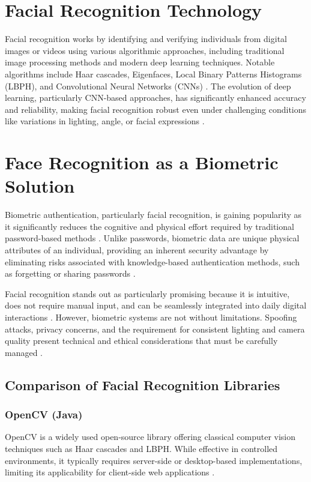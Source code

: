 \section{Facial Recognition Technology}
Facial recognition works by identifying and verifying individuals from digital images or videos using various algorithmic approaches, including traditional image processing methods and modern deep learning techniques. Notable algorithms include Haar cascades, Eigenfaces, Local Binary Patterns Histograms (LBPH), and Convolutional Neural Networks (CNNs) \autocite{ElSayed2015}. The evolution of deep learning, particularly CNN-based approaches, has significantly enhanced accuracy and reliability, making facial recognition robust even under challenging conditions like variations in lighting, angle, or facial expressions \autocite{ZhangDlib2020}.

\section{Face Recognition as a Biometric Solution}
Biometric authentication, particularly facial recognition, is gaining popularity as it significantly reduces the cognitive and physical effort required by traditional password-based methods \autocite{Furnell2022}. 
Unlike passwords, biometric data are unique physical attributes of an individual, providing an inherent security advantage by eliminating risks associated with knowledge-based authentication methods, 
such as forgetting or sharing passwords \autocite{Pant2022}.

Facial recognition stands out as particularly promising because it is intuitive, does not require manual input, and can be seamlessly integrated into daily digital interactions \autocite{Bhatt2011}. However, biometric systems are not without limitations. Spoofing attacks, privacy concerns, and the requirement for consistent lighting and camera quality present technical and ethical considerations that must be carefully managed \autocite{Kuznetsov2024, Bahia2024}.


\subsection{Comparison of Facial Recognition Libraries}

\subsubsection{OpenCV (Java)}
OpenCV is a widely used open-source library offering classical computer vision techniques such as Haar cascades and LBPH. While effective in controlled environments, it typically requires server-side or desktop-based implementations, limiting its applicability for client-side web applications \autocite{Dominguez2017}.

